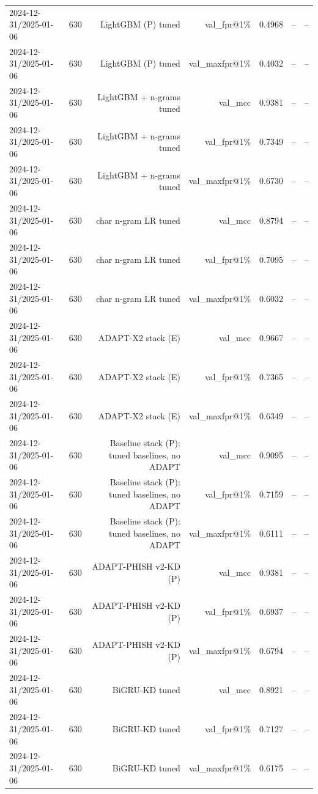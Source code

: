 \begin{table}[t]
\begin{tabular}{llrrrrr}
2024-12-31/2025-01-06 & 630 & LightGBM (P) tuned & val\_fpr@1\% & 0.4968 & -- & -- \\
2024-12-31/2025-01-06 & 630 & LightGBM (P) tuned & val\_maxfpr@1\% & 0.4032 & -- & -- \\
2024-12-31/2025-01-06 & 630 & LightGBM + n-grams tuned & val\_mcc & 0.9381 & -- & -- \\
2024-12-31/2025-01-06 & 630 & LightGBM + n-grams tuned & val\_fpr@1\% & 0.7349 & -- & -- \\
2024-12-31/2025-01-06 & 630 & LightGBM + n-grams tuned & val\_maxfpr@1\% & 0.6730 & -- & -- \\
2024-12-31/2025-01-06 & 630 & char n-gram LR tuned & val\_mcc & 0.8794 & -- & -- \\
2024-12-31/2025-01-06 & 630 & char n-gram LR tuned & val\_fpr@1\% & 0.7095 & -- & -- \\
2024-12-31/2025-01-06 & 630 & char n-gram LR tuned & val\_maxfpr@1\% & 0.6032 & -- & -- \\
2024-12-31/2025-01-06 & 630 & ADAPT-X2 stack (E) & val\_mcc & 0.9667 & -- & -- \\
2024-12-31/2025-01-06 & 630 & ADAPT-X2 stack (E) & val\_fpr@1\% & 0.7365 & -- & -- \\
2024-12-31/2025-01-06 & 630 & ADAPT-X2 stack (E) & val\_maxfpr@1\% & 0.6349 & -- & -- \\
2024-12-31/2025-01-06 & 630 & Baseline stack (P): tuned baselines, no ADAPT & val\_mcc & 0.9095 & -- & -- \\
2024-12-31/2025-01-06 & 630 & Baseline stack (P): tuned baselines, no ADAPT & val\_fpr@1\% & 0.7159 & -- & -- \\
2024-12-31/2025-01-06 & 630 & Baseline stack (P): tuned baselines, no ADAPT & val\_maxfpr@1\% & 0.6111 & -- & -- \\
2024-12-31/2025-01-06 & 630 & ADAPT-PHISH v2-KD (P) & val\_mcc & 0.9381 & -- & -- \\
2024-12-31/2025-01-06 & 630 & ADAPT-PHISH v2-KD (P) & val\_fpr@1\% & 0.6937 & -- & -- \\
2024-12-31/2025-01-06 & 630 & ADAPT-PHISH v2-KD (P) & val\_maxfpr@1\% & 0.6794 & -- & -- \\
2024-12-31/2025-01-06 & 630 & BiGRU-KD tuned & val\_mcc & 0.8921 & -- & -- \\
2024-12-31/2025-01-06 & 630 & BiGRU-KD tuned & val\_fpr@1\% & 0.7127 & -- & -- \\
2024-12-31/2025-01-06 & 630 & BiGRU-KD tuned & val\_maxfpr@1\% & 0.6175 & -- & -- \\

\end{tabular}
\end{table}
